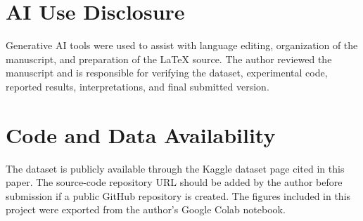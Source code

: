 \documentclass[conference]{IEEEtran}
\begin{document}
\section*{AI Use Disclosure}
Generative AI tools were used to assist with language editing, organization of the manuscript, and preparation of the LaTeX source. The author reviewed the manuscript and is responsible for verifying the dataset, experimental code, reported results, interpretations, and final submitted version.

\section*{Code and Data Availability}
The dataset is publicly available through the Kaggle dataset page cited in this paper. The source-code repository URL should be added by the author before submission if a public GitHub repository is created. The figures included in this project were exported from the author's Google Colab notebook.



\balance
\end{document}
